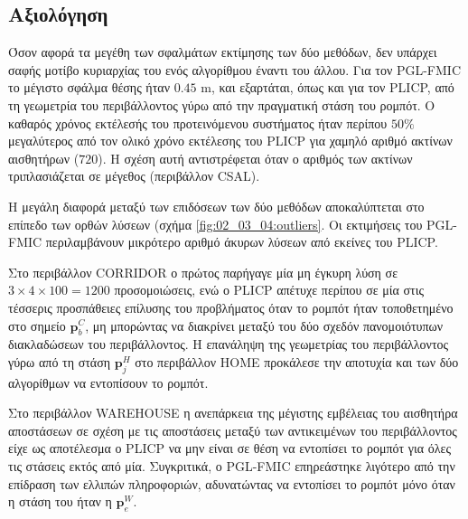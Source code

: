 \subsection{Αξιολόγηση}
\label{subsection:02_03_04:03}

Όσον αφορά τα μεγέθη των σφαλμάτων εκτίμησης των δύο μεθόδων, δεν υπάρχει σαφής
μοτίβο κυριαρχίας του ενός αλγορίθμου έναντι του άλλου. Για τον PGL-FMIC το
μέγιστο σφάλμα θέσης ήταν $0.45$ m, και εξαρτάται, όπως και για τον PLICP, από
τη γεωμετρία του περιβάλλοντος γύρω από την πραγματική στάση του ρομπότ.  Ο
καθαρός χρόνος εκτέλεσής του προτεινόμενου συστήματος ήταν περίπου $50\%$
μεγαλύτερος από τον ολικό χρόνο εκτέλεσης του PLICP για χαμηλό αριθμό ακτίνων
αισθητήρων ($720$). H σχέση αυτή αντιστρέφεται όταν ο αριθμός των ακτίνων
τριπλασιάζεται σε μέγεθος (περιβάλλον CSAL).

Η μεγάλη διαφορά μεταξύ των επιδόσεων των δύο μεθόδων αποκαλύπτεται στο επίπεδο
των ορθών λύσεων (σχήμα \ref{fig:02_03_04:outliers}. Οι εκτιμήσεις του PGL-FMIC
περιλαμβάνουν μικρότερο αριθμό άκυρων λύσεων από εκείνες του PLICP.

Στο περιβάλλον CORRIDOR ο πρώτος παρήγαγε μία μη έγκυρη λύση σε
$3\times4\times100 = 1200$  προσομοιώσεις, ενώ ο PLICP απέτυχε περίπου σε μία
στις τέσσερις προσπάθειες επίλυσης του προβλήματος όταν το ρομπότ ήταν
τοποθετημένο στο σημείο $\bm{p}_b^C$, μη μπορώντας να διακρίνει μεταξύ του δύο
σχεδόν πανομοιότυπων διακλαδώσεων του περιβάλλοντος. Η επανάληψη της γεωμετρίας
του περιβάλλοντος γύρω από τη στάση $\bm{p}_j^H$ στο περιβάλλον HOME προκάλεσε
την αποτυχία και των δύο αλγορίθμων να εντοπίσουν το ρομπότ.

Στο περιβάλλον WAREHOUSE η ανεπάρκεια της μέγιστης εμβέλειας του αισθητήρα
αποστάσεων σε σχέση με τις αποστάσεις μεταξύ των αντικειμένων του περιβάλλοντος
είχε ως αποτέλεσμα ο PLICP να μην είναι σε θέση να εντοπίσει το ρομπότ για όλες
τις στάσεις εκτός από μία. Συγκριτικά, ο PGL-FMIC επηρεάστηκε λιγότερο από την
επίδραση των ελλιπών πληροφοριών, αδυνατώντας να εντοπίσει το ρομπότ μόνο όταν
η στάση του ήταν η $\bm{p}_e^W$.

